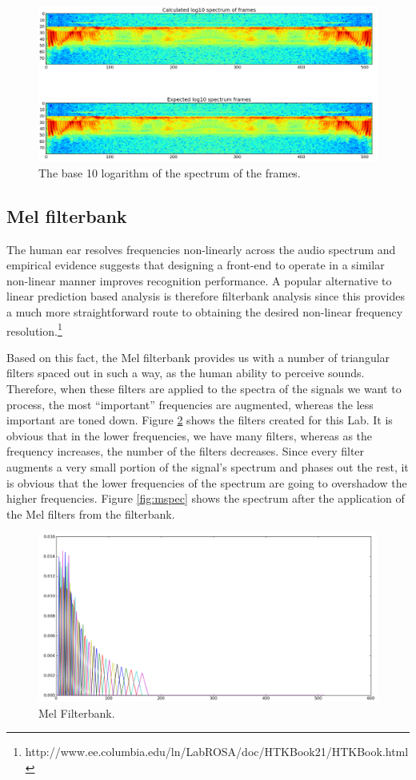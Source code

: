 \documentclass[12pt,a4paper,oneside]{article}
\begin{document}
\begin{figure}
\includegraphics[scale=0.4]{../logspec.png}
\caption{The base 10 logarithm of the spectrum of the frames.}
\label{fig:logspec}
\end{figure}

\subsection{Mel filterbank}
The human ear resolves frequencies non-linearly across the audio spectrum and empirical evidence suggests that designing a front-end to operate in a similar non-linear manner improves recognition performance. A popular alternative to linear prediction based analysis is therefore filterbank analysis since this provides a much more straightforward route to obtaining the desired non-linear frequency resolution.\footnote{http://www.ee.columbia.edu/ln/LabROSA/doc/HTKBook21/HTKBook.html}

Based on this fact, the Mel filterbank provides us with a number of triangular filters spaced out in such a way, as the human ability to perceive sounds. Therefore, when these filters are applied to the spectra of the signals we want to process, the most ``important'' frequencies are augmented, whereas the less important are toned down. Figure \ref{fig:filterbank} shows the filters created for this Lab. It is obvious that in the lower frequencies, we have many filters, whereas as the frequency increases, the number of the filters decreases. Since every filter augments a very small portion of the signal's spectrum and phases out the rest, it is obvious that the lower frequencies of the spectrum are going to overshadow the higher frequencies. Figure \ref{fig:mspec} shows the spectrum after the application of the Mel filters from the filterbank.

\begin{figure}
\centering
\includegraphics[scale=0.4]{../filterbank.png}
\caption{Mel Filterbank.}
\label{fig:filterbank}
\end{figure}
\end{document}

